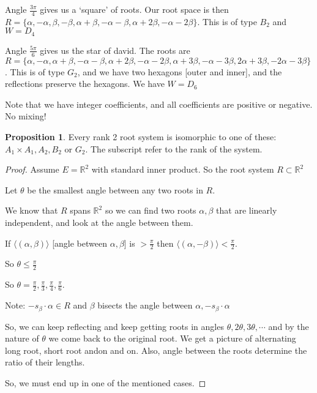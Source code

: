 \documentclass{article}
\theoremstyle{definition}
\newtheorem{proposition}{Proposition}
\begin{document}
Angle \(\frac{3\pi}{4}\) gives us a `square' of roots. Our root space is then \(R=\{ \alpha ,-\alpha ,\beta ,-\beta ,\alpha +\beta ,-\alpha -\beta ,\alpha +2\beta ,-\alpha -2\beta  \} \). This is of type \(B_2\) and \(W = D_4\) 

Angle \(\frac{5\pi}{6}\) gives us the star of david. The roots are \(R=\{\alpha ,-\alpha ,\alpha +\beta ,-\alpha -\beta ,\alpha +2\beta ,-\alpha -2\beta ,\alpha +3\beta ,-\alpha -3\beta,2\alpha +3\beta ,-2\alpha -3\beta\}\). This is of type \(G_2\), and we have two hexagons [outer and inner], and the reflections preserve the hexagons. We have \(W = D_6\) 

Note that we have integer coefficients, and all coefficients are positive or negative. No mixing!

\begin{proposition}
    Every rank 2 root system is isomorphic to one of these: \(A_1\times A_1,A_2, B_2\) or \(G_2\). The subscript refer to the rank of the system.
\end{proposition}

\begin{proof}
    Assume \(E=\mathbb{R}^2\) with standard inner product. So the root system \(R \subset\mathbb{R}^2\) 

    Let \(\theta\) be the smallest angle between any two roots in \(R\).

    We know that \(R\) spans \(\mathbb{R}^2\) so we can find two roots \(\alpha ,\beta \) that are linearly independent, and look at the angle between them.

    If \(\langle (\alpha ,\beta ) \rangle \) [angle between \(\alpha ,\beta \)] is \(>\frac{\pi}{2}\) then \(\langle (\alpha ,-\beta) \rangle < \frac{\pi}{2}\).

    So \(\theta\leq\frac{\pi}{2}\) 

    So \(\theta=\frac{\pi}{2},\frac{\pi}{3},\frac{\pi}{4},\frac{\pi}{6}\).

    Note: \(-s_\beta \cdot \alpha \in R\) and \(\beta \) bisects the angle between \(\alpha,-s_\beta \cdot \alpha \) 

    So, we can keep reflecting and keep getting roots in angles \(\theta ,2\theta ,3\theta ,\cdots\) and by the nature of \(\theta \) we come back to the original root. We get a picture of alternating long root, short root andon and on. Also, angle between the roots determine the ratio of their lengths.

    So, we must end up in one of the mentioned cases.

\end{proof}
\end{document}

